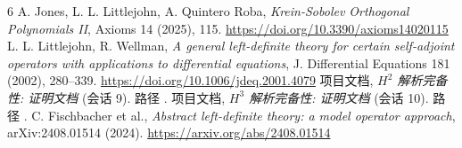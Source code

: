\documentclass[UTF8]{ctexart}
\begin{document}
\begingroup\sloppy
\begin{thebibliography}{6}
 A. Jones, L. L. Littlejohn, A. Quintero Roba, \emph{Krein-Sobolev
	Orthogonal Polynomials II}, Axioms 14 (2025), 115.
	\url{https://doi.org/10.3390/axioms14020115}
 L. L. Littlejohn, R. Wellman, \emph{A general left-definite theory
	for certain self-adjoint operators with applications to differential equations},
	J. Differential Equations 181 (2002), 280--339.
	\url{https://doi.org/10.1006/jdeq.2001.4079}
 项目文档, \emph{$H^2$ 解析完备性: 证明文档} (会话 9).
	路径 .
 项目文档, \emph{$H^3$ 解析完备性: 证明文档} (会话 10).
	路径 .
 C. Fischbacher et al., \emph{Abstract left-definite theory: a model
	operator approach}, arXiv:2408.01514 (2024).
	\url{https://arxiv.org/abs/2408.01514}
\end{thebibliography}
\end{document}
